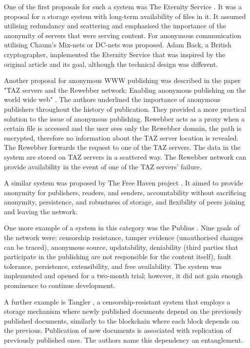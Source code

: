 One of the first proposals for such a system was The Eternity Service \cite{eternity}. It was a proposal for a storage system with long-term availability of files in it. It assumed utilising redundancy and scattering and emphasised the importance of the anonymity of servers that were serving content. For anonymous communication utilising Chaum's Mix-nets or DC-nets was proposed. Adam Back, a British cryptographer, implemented the Eternity Service \cite{back1997eternity} that was inspired by the original article and its goal, although the technical design was different.

Another proposal for anonymous WWW publishing was described in the paper "TAZ servers and the Rewebber network: Enabling anonymous publishing on the world wide web" \cite{rewebber}. The authors underlined the importance of anonymous publishers throughout the history of publication. They provided a more practical solution to the issue of anonymous publishing.  Rewebber acts as a proxy when a certain file is accessed and the user sees only the Rewebber domain, the path is encrypted, therefore no information about the TAZ server location is revealed. The Rewebber forwards the request to one of the TAZ servers. The data in the system are stored on TAZ servers in a scattered way. The Rewebber network can provide availability in the event of one of the TAZ servers' failure.

A similar system was proposed by The Free Haven project \cite{freehaven}. It aimed to provide anonymity for publishers, readers, and senders, accountability without sacrificing anonymity, persistence, and robustness of storage, and flexibility of peers joining and leaving the network.

One more example of a system in this category was the Publius \cite{publius}. Nine goals of the network were: censorship resistance, tamper evidence (unauthorised changes can be traced), anonymous source, updatability, deniability (third parties that participate in the publishing are not responsible for the content itself), fault tolerance, persistence, extensibility, and free availability. The system was implemented and opened for a two-month trial; however, it did not gain enough prominence to continue development.

A further example is Tangler \cite{tangler},  a censorship-resistant system that employs a storage mechanism where newly published documents depend on the previously published documents, similarly to the blockchain where each block depends on the previous. Publication of new documents is associated with replication of previously published ones. The authors name this dependency an entanglement.

